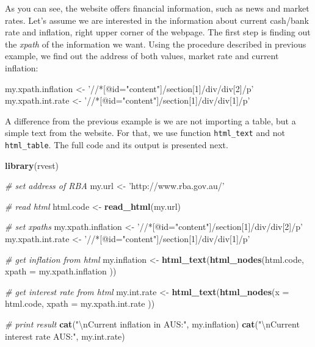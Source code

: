 \documentclass[11pt,]{book}
\newenvironment{Shaded}{\begin{snugshade}}{\end{snugshade}}
\newcommand{\KeywordTok}[1]{\textcolor[rgb]{0.27,0.27,0.27}{\textbf{#1}}}
\newcommand{\DataTypeTok}[1]{\textcolor[rgb]{0.27,0.27,0.27}{#1}}
\newcommand{\CharTok}[1]{\textcolor[rgb]{0.5,0.5,0.5}{#1}}
\newcommand{\StringTok}[1]{\textcolor[rgb]{0.5,0.5,0.5}{#1}}
\newcommand{\CommentTok}[1]{\textcolor[rgb]{0.56,0.35,0.01}{\textit{#1}}}
\newcommand{\NormalTok}[1]{#1}
\begin{document}
As you can see, the website offers financial information, such as news
and market rates. Let's assume we are interested in the information
about current cash/bank rate and inflation, right upper corner of the
webpage. The first step is finding out the \emph{xpath} of the
information we want. Using the procedure described in previous example,
we find out the address of both values, market rate and current
inflation:

\begin{Shaded}
\begin{Highlighting}[]
\NormalTok{my.xpath.inflation <-}\StringTok{ '//*[@id="content"]/section[1]/div/div[2]/p'}
\NormalTok{my.xpath.int.rate <-}\StringTok{ '//*[@id="content"]/section[1]/div/div[1]/p'}
\end{Highlighting}
\end{Shaded}

A difference from the previous example is we are not importing a table,
but a simple text from the website. For that, we use function
\texttt{html\_text} and not \texttt{html\_table}. The full code and its
output is presented next.

\begin{Shaded}
\begin{Highlighting}[]
\KeywordTok{library}\NormalTok{(rvest)}

\CommentTok{# set address of RBA}
\NormalTok{my.url <-}\StringTok{ 'http://www.rba.gov.au/'}

\CommentTok{# read html}
\NormalTok{html.code <-}\StringTok{ }\KeywordTok{read_html}\NormalTok{(my.url)}

\CommentTok{# set xpaths}
\NormalTok{my.xpath.inflation <-}\StringTok{ '//*[@id="content"]/section[1]/div/div[2]/p'}
\NormalTok{my.xpath.int.rate <-}\StringTok{ '//*[@id="content"]/section[1]/div/div[1]/p'}

\CommentTok{# get inflation from html}
\NormalTok{my.inflation <-}\StringTok{ }\KeywordTok{html_text}\NormalTok{(}\KeywordTok{html_nodes}\NormalTok{(html.code,}
                                     \DataTypeTok{xpath =}\NormalTok{ my.xpath.inflation ))}

\CommentTok{# get interest rate from html}
\NormalTok{my.int.rate <-}\StringTok{ }\KeywordTok{html_text}\NormalTok{(}\KeywordTok{html_nodes}\NormalTok{(}\DataTypeTok{x =}\NormalTok{ html.code,}
                                   \DataTypeTok{xpath =}\NormalTok{ my.xpath.int.rate ))}

\CommentTok{# print result}
\KeywordTok{cat}\NormalTok{(}\StringTok{"}\CharTok{\textbackslash{}n}\StringTok{Current inflation in AUS:"}\NormalTok{, my.inflation)}
\KeywordTok{cat}\NormalTok{(}\StringTok{"}\CharTok{\textbackslash{}n}\StringTok{Current interest rate AUS:"}\NormalTok{, my.int.rate)}
\end{Highlighting}
\end{Shaded}
\end{document}
